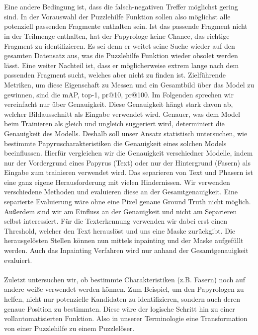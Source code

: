 \documentclass[12pt,a4paper]{article}
\begin{document}
\\\\
Eine andere Bedingung ist, dass die falsch-negativen Treffer möglichst gering sind. In der Vorauswahl der Puzzlehilfe Funktion sollen also möglichst alle potenziell passenden Fragmente enthalten sein. Ist das passende Fragment nicht in der Teilmenge enthalten, hat der Papyrologe keine Chance, das richtige Fragment zu identifizieren. Es sei denn er weitet seine Suche wieder auf den gesamten Datensatz aus, was die Puzzlehilfe Funktion wieder obsolet werden lässt. %
Eine weiter %
Nachteil ist, dass er möglicherweise extrem lange nach dem passenden Fragment sucht, welches aber nicht zu finden ist. 
Zielführende Metriken, um diese Eigenschaft zu Messen und ein Gesamtbild über das Model zu gewinnen, sind die mAP, top-1, pr@10, pr@100. Im Folgenden sprechen wir %
vereinfacht nur über Genauigkeit. Diese Genauigkeit hängt stark davon ab, welcher Bildausschnitt als Eingabe verwendet wird. Genauer, was dem Model beim Trainieren als gleich und ungleich suggeriert wird, determiniert die Genauigkeit des Modells. 
Deshalb soll unser %
Ansatz statistisch untersuchen, wie bestimmte Papyruscharakteristiken die Genauigkeit eines solchen Models beeinflussen. Hierfür vergleichen wir %
die Genauigkeit verschiedner %
Modelle, indem nur der Vordergrund eines Papyrus (Text) oder nur %
der Hintergrund (Fasern) als Eingabe zum trainieren verwendet wird. Das separieren von Text und Phasern ist eine ganz %
eigene Herausforderung mit vielen Hindernissen. %
Wir verwenden verschiedene Methoden und evaluieren diese an der Gesamtgenauigkeit. Eine separierte Evaluierung wäre ohne eine Pixel genaue Ground Truth nicht möglich. Außerdem sind wir am Einfluss an der Genauigkeit und nicht am Separieren selbst interessiert. Für die Texterkennung verwenden wir dabei erst einen Threshold, welcher den Text herauslöst und uns eine Maske zurückgibt. Die herausgelösten Stellen können nun mittels inpainting und der Maske aufgefüllt werden. Auch das Inpainting Verfahren wird nur anhand der Gesamtgenauigkeit evaluiert.
\\\\
Zuletzt untersuchen wir, ob bestimmte Charakteristiken (z.B. Fasern) noch auf andere weiße verwendet werden können. Zum Beispiel, um den Papyrologen zu helfen, nicht nur potenzielle Kandidaten zu identifizieren, sondern auch deren genaue Position zu bestimmten. Diese wäre der logische Schritt hin zu einer vollautomatisierten Funktion. Also in unserer Terminologie eine Transformation von einer Puzzlehilfe zu einem Puzzlelöser. %
\end{document}

